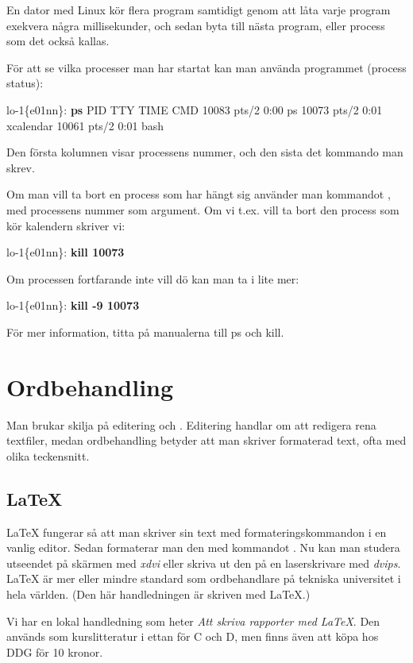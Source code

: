\documentclass[a4paper,twocolumn]{book}
\begin{document}
En dator med Linux kör flera program samtidigt genom
att låta varje program exekvera några millisekunder, och sedan byta
till nästa program, eller process som det också kallas.

För att se vilka processer man har startat kan man använda programmet
 (process status):
\begin{example}
  lo-1\{e01nn\}: \textbf{ps}
  PID TTY      TIME CMD
  10083 pts/2    0:00 ps
  10073 pts/2    0:01 xcalendar
  10061 pts/2    0:01 bash
\end{example}
Den första kolumnen visar processens nummer, och den sista det
kommando man skrev.

Om man vill ta bort en process som har hängt sig använder man
kommandot , med processens nummer som argument.
Om vi t.ex. vill ta bort den process som kör
kalendern skriver vi:
\begin{example}
  lo-1\{e01nn\}: \textbf{kill 10073}
\end{example}
Om processen fortfarande inte vill dö kan man ta i lite mer:
\begin{example}
  lo-1\{e01nn\}: \textbf{kill -9 10073}
\end{example}
För mer information, titta på manualerna till ps och kill.

\section{Ordbehandling}

Man brukar skilja på editering och . Editering
handlar om att redigera rena textfiler, medan ordbehandling betyder
att man skriver formaterad text, ofta med olika teckensnitt.

\subsection{\LaTeX}

\LaTeX{} fungerar så
att man skriver sin text med formateringskommandon i en vanlig
editor. Sedan formaterar man den med kommandot . Nu
kan man studera utseendet på skärmen med \emph{xdvi} eller skriva ut
den på en laserskrivare med \emph{dvips}. \LaTeX{} är mer eller mindre
standard som ordbehandlare på tekniska universitet i hela världen.  (Den
här handledningen är skriven med \LaTeX.)

Vi har en lokal handledning som heter \emph{Att skriva rapporter med
  \LaTeX}. Den används som kurslitteratur i ettan för C och D, men finns även
att köpa hos DDG för 10 kronor.
\end{document}
